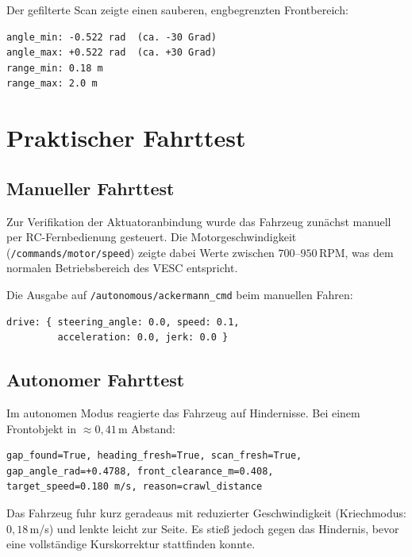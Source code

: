 Der gefilterte Scan zeigte einen sauberen, engbegrenzten Frontbereich:
\begin{lstlisting}[caption={Scan-Metadaten nach korrekter Kalibrierung}]
angle_min: -0.522 rad  (ca. -30 Grad)
angle_max: +0.522 rad  (ca. +30 Grad)
range_min: 0.18 m
range_max: 2.0 m
\end{lstlisting}

\section{Praktischer Fahrttest}

\subsection{Manueller Fahrttest}

Zur Verifikation der Aktuatoranbindung wurde das Fahrzeug zunächst
manuell per RC-Fernbedienung gesteuert. Die Motorgeschwindigkeit
(\texttt{/commands/motor/speed}) zeigte dabei Werte zwischen
$700$--$950$\,RPM, was dem normalen Betriebsbereich des VESC entspricht.

Die Ausgabe auf \texttt{/autonomous/ackermann\_cmd} beim manuellen Fahren:
\begin{lstlisting}[caption={Ackermann-Kommando während manueller Fahrt}]
drive: { steering_angle: 0.0, speed: 0.1,
         acceleration: 0.0, jerk: 0.0 }
\end{lstlisting}

\subsection{Autonomer Fahrttest}

Im autonomen Modus reagierte das Fahrzeug auf Hindernisse.
Bei einem Frontobjekt in $\approx 0{,}41$\,m Abstand:
\begin{lstlisting}[caption={Planerstatus bei nahem Frontobjekt}]
gap_found=True, heading_fresh=True, scan_fresh=True,
gap_angle_rad=+0.4788, front_clearance_m=0.408,
target_speed=0.180 m/s, reason=crawl_distance
\end{lstlisting}

Das Fahrzeug fuhr kurz geradeaus mit reduzierter Geschwindigkeit
(Kriechmodus: $0{,}18$\,m/s) und lenkte leicht zur Seite.
Es stieß jedoch gegen das Hindernis, bevor eine vollständige
Kurskorrektur stattfinden konnte.


